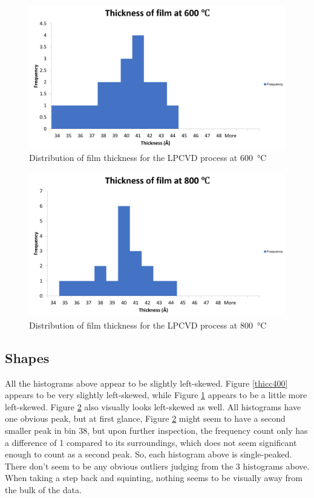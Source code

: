 \documentclass[letterpaper]{article}
\begin{document}
\begin{figure}[H]
 \centering
 \includegraphics[width=\textwidth]{thicc600.png}
 \caption{Distribution of film thickness for the LPCVD process at \SI{600}{\celsius}}
 \label{thicc600}
\end{figure}

\begin{figure}[H]
 \centering
 \includegraphics[width=\textwidth]{thicc800.png}
 \caption{Distribution of film thickness for the LPCVD process at \SI{800}{\celsius}}
 \label{thicc800}
\end{figure}

\subsection{Shapes}
\label{Shapes}
All the histograms above appear to be slightly left-skewed. Figure
\ref{thicc400} appears to be very slightly left-skewed, while Figure
\ref{thicc600} appears to be a little more left-skewed. Figure \ref{thicc800}
also visually looks left-skewed as well. All histograms have one obvious peak,
but at first glance, Figure \ref{thicc800} might seem to have a second smaller
peak in bin 38, but upon further inspection, the frequency count only has a
difference of 1 compared to its surroundings, which does not seem significant
enough to count as a second peak. So, each histogram above is single-peaked.
There don’t seem to be any obvious outliers judging from the 3 histograms above.
When taking a step back and squinting, nothing seems to be visually away from
the bulk of the data.
\end{document}

